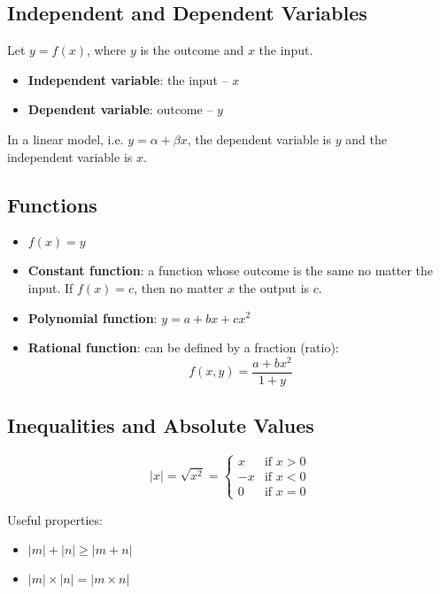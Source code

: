 \subsection{Independent and Dependent Variables}

Let $y = f(x)$, where $y$ is the outcome and $x$ the input.

\begin{itemize}
    \item \textbf{Independent variable}: the input -- $x$
    \item \textbf{Dependent variable}: outcome -- $y$
\end{itemize}

\noindent In a linear model, i.e. $y = \alpha + \beta x$, the dependent variable is $y$ and the independent variable is $x$.

\subsection{Functions}

\begin{itemize}
    \item $f(x) = y$
    \item \textbf{Constant function}: a function whose outcome is the same no matter the input. If $f(x) = c$, then no matter $x$ the output is $c$.
    \item \textbf{Polynomial function}: $y = a + bx + cx^2$ 
    \item \textbf{Rational function}: can be defined by a fraction (ratio):
    \begin{equation*}
        f(x,y) = \frac{a + bx^2}{1 + y}
    \end{equation*} 
\end{itemize}

\subsection{Inequalities and Absolute Values}

\[ |x| = \sqrt{x^2} = \begin{cases} 
    x & \text{if } x > 0 \\
    -x & \text{if } x < 0 \\
    0 & \text{if } x = 0 
\end{cases} \]

\noindent Useful properties:

\begin{itemize}
    \itemsep-0.25em 
    \item $|m| + |n| \geq |m + n|$
    \item $|m| \times |n| = |m \times n|$
\end{itemize}

